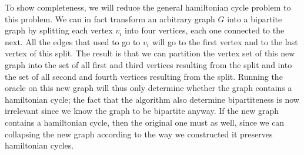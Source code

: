 \documentclass[letterpaper,11pt]{article}
\begin{document}
\begin{enumerate}
\begin{enumerate}
                To show completeness, we will reduce the general hamiltonian
                cycle problem to this problem. We can in fact transform an
                arbitrary graph $G$ into a bipartite graph by splitting each
                vertex $v_i$ into four vertices, each one connected to the
                next. All the edges that used to go to $v_i$ will go to the
                first vertex and to the last vertex of this split. The result
                is that we can partition the vertex set of this new graph into
                the set of all first and third vertices resulting from the
                split and into the set of all second and fourth vertices
                resulting from the split. Running the oracle on this new graph
                will thus only determine whether the graph contains a
                hamiltonian cycle; the fact that the algorithm also determine
                bipartiteness is now irrelevant since we know the graph to be
                bipartite anyway. If the new graph contains a hamiltonian
                cycle, then the original one must as well, since we can
                collapsing the new graph according to the way we constructed it
                preserves hamiltonian cycles.
        \end{enumerate}
\end{enumerate}
\end{document}
